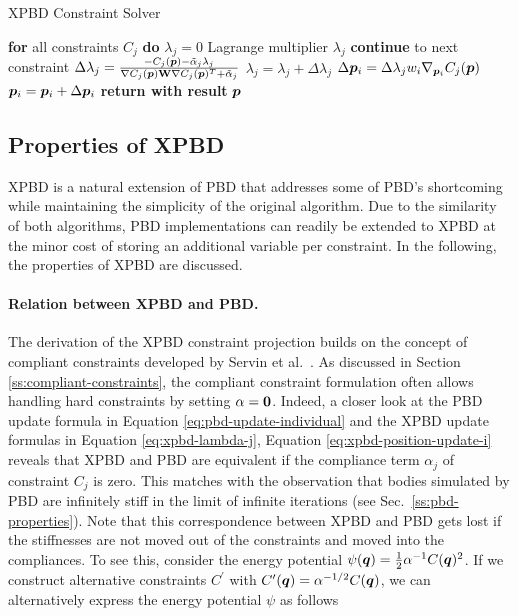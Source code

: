 \begin{algorithm}
\caption{XPBD Constraint Solver}\label{alg:xpbd-solver}
\begin{algorithmic}[1]
\State \textbf{for} all constraints $C_j$ \textbf{do} $\lambda_j = 0$
\StatexIndent[3] Lagrange multiplier $\lambda_j$ \algorithmicdo
{}
\State \textbf{continue} to next constraint
\EndIf
\State $\Delta \lambda_j = \frac{-C_j(\bm{p}) - \tilde{\alpha}_j \lambda_{j}}{\nabla C_j(\bm{p}) \mathbf{W} \nabla C_j(\bm{p})^T + \tilde{\alpha}_j}$
\State $\lambda_{j} = \lambda_{j} + \Delta \lambda_j$
\State $\Delta \bm{p}_i = \Delta \lambda_j w_i \nabla_{\bm{p}_i} C_j(\bm{p})$
\State $\bm{p}_i = \bm{p}_i + \Delta \bm{p}_i$
\EndFor
\EndFor
\EndFor
\State \textbf{return with result } $\bm{p}$
\EndProcedure
\end{algorithmic}
\end{algorithm}

\subsection{Properties of XPBD}\label{ss:xpbd-properties}
XPBD is a natural extension of PBD that addresses some of PBD's shortcoming while maintaining the simplicity of the original algorithm. Due to
the similarity of both algorithms, PBD implementations can readily be extended to XPBD at the minor cost of storing an additional variable per 
constraint. In the following, the properties of XPBD are discussed.

\paragraph{Relation between XPBD and PBD.}
The derivation of the XPBD constraint projection builds on the concept of compliant constraints developed by Servin et al.\ 
\cite{servin2006}. As discussed in Section \ref{ss:compliant-constraints}, the compliant constraint formulation often allows handling hard constraints by
setting $\mathbf{\alpha} = \mathbf{0}$. Indeed, a closer look at the PBD update formula in Equation \ref{eq:pbd-update-individual} and the XPBD update 
formulas in Equation \ref{eq:xpbd-lambda-j}, Equation \ref{eq:xpbd-position-update-i} reveals that XPBD and 
PBD are equivalent if the compliance term $\alpha_j$ of constraint $C_j$ is zero. This matches with the observation that bodies 
simulated by PBD are infinitely stiff in the limit of infinite iterations (see Sec.\ \ref{ss:pbd-properties}). Note that this correspondence between XPBD 
and PBD gets lost if the stiffnesses are not moved out of the constraints and moved into the compliances. To see this, consider the energy 
potential $\psi(\bm{q}) = \frac{1}{2} \alpha^{-1} C(\bm{q})^2$. If we construct alternative constraints $C^\prime$ with $C^\prime(\bm{q}) = 
\alpha^{-1/2}C(\bm{q})$, we can alternatively express the energy potential $\psi$ as follows

